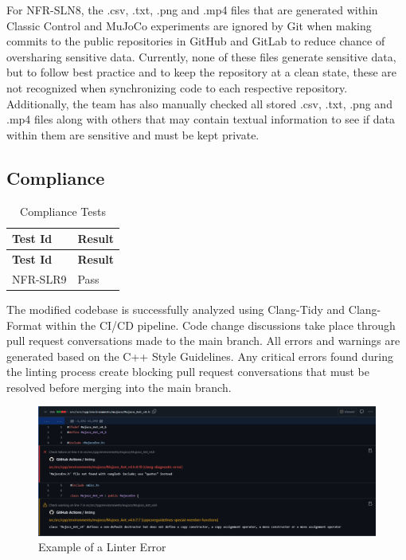 \documentclass[12pt, titlepage]{article}
\begin{document}
For NFR-SLN8, the .csv, .txt, .png and .mp4 files that are generated within Classic Control and MuJoCo experiments are ignored by Git when making commits to the public repositories in GitHub and GitLab to reduce chance of oversharing sensitive data. Currently, none of these files generate sensitive data, but to follow best practice and to keep the repository at a clean state, these are not recognized when synchronizing code to each respective repository. Additionally, the team has also manually checked all stored .csv, .txt, .png and .mp4 files along with others that may contain textual information to see if data within them are sensitive and must be kept private. 

\subsection{Compliance}\label{compliance}

\begin{center}
\begin{longtable}{|p{4cm}|p{4cm}|}
\caption{Compliance Tests} \\
\hline
\textbf{Test Id} & \textbf{Result} \\
\hline
\endfirsthead
\hline
\textbf{Test Id} & \textbf{Result} \\
\hline
\endhead
NFR-SLR9 & Pass \\
\hline
\end{longtable}
\end{center}

The modified codebase is successfully analyzed using Clang-Tidy and Clang-Format within the CI/CD pipeline. 
Code change discussions take place through pull request conversations made to the main branch. 
All errors and warnings are generated based on the C++ Style Guidelines. 
Any critical errors found during the linting process create blocking pull request conversations that must be resolved before merging into the main branch.

\begin{figure}[h]
  \centering
  \includegraphics[width=1\textwidth]{img/linter-example.png}
  \caption{Example of a Linter Error}
\end{figure}
\end{document}
